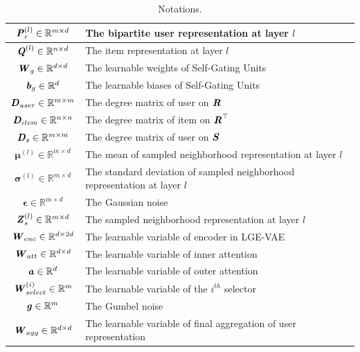 \documentclass[letterpaper]{article} %
\begin{document}
\begin{table}[ht]
\begin{tabular}{c|p{6.0cm}}
         $\textbf{\textit{P}}^{(l)}_{r}\in \mathbb{R}^{m\times d}$    &The bipartite user representation at layer $l$\\ \hline
         $\textbf{\textit{Q}}^{(l)}\in \mathbb{R}^{n\times d}$    &The item representation at layer $l$\\ \hline
         $\textbf{\textit{W}}_g\in \mathbb{R}^{d\times d}$    &The learnable weights of Self-Gating Units\\ \hline
         $\textbf{\textit{b}}_g\in \mathbb{R}^{d}$    &The learnable biases of Self-Gating Units\\ \hline
         $\textbf{\textit{D}}_{user}\in \mathbb{R}^{m\times m}$ &The degree matrix of user on $\textbf{\textit{R}}$\\ \hline
         $\textbf{\textit{D}}_{item}\in \mathbb{R}^{n\times n}$ &The degree matrix of item on $\textbf{\textit{R}}^{\top}$\\ \hline
         $\textbf{\textit{D}}_s\in \mathbb{R}^{m\times m}$    &The degree matrix of user on $\textbf{\textit{S}}$\\ \hline
         $\boldsymbol{\mu}^{(l)}\in \mathbb{R}^{m\times d}$   &The mean of sampled neighborhood representation at layer $l$\\ \hline
         $\boldsymbol{\sigma}^{(l)}\in \mathbb{R}^{m\times d}$    &The standard deviation of sampled neighborhood representation at layer $l$\\ \hline
         $\boldsymbol{\epsilon}\in \mathbb{R}^{m\times d}$    &The Gaussian noise\\ \hline
         $\textbf{\textit{Z}}_s^{(l)} \in \mathbb{R}^{m\times d}$  &The sampled neighborhood representation at layer $l$\\ \hline
         $\textbf{\textit{W}}_{enc}\in \mathbb{R}^{d\times 2d}$    &The learnable variable of encoder in LGE-VAE\\ \hline
         $\textbf{\textit{W}}_{att}\in \mathbb{R}^{d\times d}$    &The learnable variable of inner attention\\ \hline
         $\textbf{\textit{a}}\in \mathbb{R}^{d}$  &The learnable variable of outer attention\\ \hline
         $\textbf{\textit{W}}_{select}^{(i)}\in \mathbb{R}^m$   &The learnable variable of the $i^{th}$ selector\\ \hline
         $\textbf{\textit{g}}\in \mathbb{R}^m$  &The Gumbel noise\\ \hline
         $\textbf{\textit{W}}_{agg} \in \mathbb{R}^{d\times d}$ &The learnable variable of final aggregation of user representation\\ \hline
    \end{tabular}
    \caption{Notations.}
\end{table}

\end{document}
